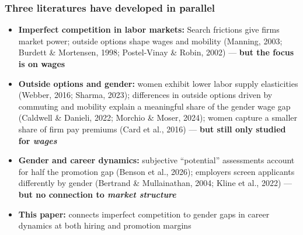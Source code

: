 \documentclass[aspectratio=169, 11pt]{beamer}
\newcommand{\bmark}[1]{\textcolor{midblue}{\textbf{#1}}}
\begin{document}

\begin{frame}
\frametitle{Three literatures have developed in parallel}

\small
\begin{itemize}\itemsep3pt
    \item \textbf{Imperfect competition in labor markets:} Search frictions give firms market power; outside options shape wages and mobility {\scriptsize\textcolor{muted}{(Manning, 2003; Burdett \& Mortensen, 1998; Postel-Vinay \& Robin, 2002)}} --- \bmark{but the focus is on wages}

    \item \textbf{Outside options and gender:} women exhibit lower labor supply elasticities (Webber, 2016; Sharma, 2023); differences in outside options driven by commuting and mobility explain a meaningful share of the gender wage gap (Caldwell \& Danieli, 2022; Morchio \& Moser, 2024); women capture a smaller share of firm pay premiums (Card et al., 2016) --- \bmark{but still only studied for \emph{wages}}

    \item \textbf{Gender and career dynamics:} subjective ``potential'' assessments account for half the promotion gap (Benson et al., 2026); employers screen applicants differently by gender (Bertrand \& Mullainathan, 2004; Kline et al., 2022) --- \bmark{but no connection to \emph{market structure}}

    \item \textbf{This paper:} connects imperfect competition to gender gaps in career dynamics at both hiring and promotion margins
\end{itemize}

\end{frame}

\end{document}
